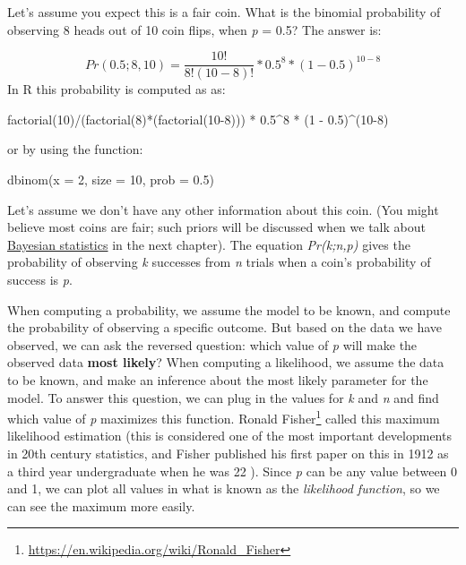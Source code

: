 \documentclass[
  oneside]{krantz}
\makeatletter
\newenvironment{Shaded}{\begin{snugshade}}{\end{snugshade}}
\newcommand{\AttributeTok}[1]{\textcolor[rgb]{0.61,0.61,0.61}{#1}}
\newcommand{\DecValTok}[1]{\textcolor[rgb]{0.06,0.06,0.06}{#1}}
\newcommand{\FloatTok}[1]{\textcolor[rgb]{0.06,0.06,0.06}{#1}}
\newcommand{\FunctionTok}[1]{\textcolor[rgb]{0,0,0}{#1}}
\newcommand{\NormalTok}[1]{#1}
\newcommand{\SpecialCharTok}[1]{\textcolor[rgb]{0,0,0}{#1}}
\renewcommand{\href}[2]{#2\footnote{\url{#1}}}
\newenvironment{kframe}{%
\medskip{}
\setlength{\fboxsep}{.8em}
 \def\at@end@of@kframe{}%
 \ifinner\ifhmode%
  \def\at@end@of@kframe{\end{minipage}}%
  \begin{minipage}{\columnwidth}%
 \fi\fi%
 \def\FrameCommand##1{\hskip\@totalleftmargin \hskip-\fboxsep
 \colorbox{shadecolor}{##1}\hskip-\fboxsep
     \hskip-\linewidth \hskip-\@totalleftmargin \hskip\columnwidth}%
 \MakeFramed {\advance\hsize-\width
   \@totalleftmargin\z@ \linewidth\hsize
   \@setminipage}}%
 {\par\unskip\endMakeFramed%
 \at@end@of@kframe}
\renewenvironment{Shaded}{\begin{kframe}}{\end{kframe}}
\makeatother
\begin{document}
Let's assume you expect this is a fair coin. What is the binomial probability of observing 8 heads out of 10 coin flips, when \emph{p} = 0.5? The answer is:

\[
Pr\left(0.5;8,10 \right) = \frac{10!}{8!\left( 10 - 8 \right)!}*0.5^{8}*{(1 - 0.5)}^{10 - 8}
\]
In R this probability is computed as as:

\begin{Shaded}
\begin{Highlighting}[]
\FunctionTok{factorial}\NormalTok{(}\DecValTok{10}\NormalTok{)}\SpecialCharTok{/}\NormalTok{(}\FunctionTok{factorial}\NormalTok{(}\DecValTok{8}\NormalTok{)}\SpecialCharTok{*}\NormalTok{(}\FunctionTok{factorial}\NormalTok{(}\DecValTok{10{-}8}\NormalTok{))) }\SpecialCharTok{*} \FloatTok{0.5}\SpecialCharTok{\^{}}\DecValTok{8} \SpecialCharTok{*}\NormalTok{ (}\DecValTok{1} \SpecialCharTok{{-}} \FloatTok{0.5}\NormalTok{)}\SpecialCharTok{\^{}}\NormalTok{(}\DecValTok{10{-}8}\NormalTok{)}
\end{Highlighting}
\end{Shaded}

or by using the function:

\begin{Shaded}
\begin{Highlighting}[]
\FunctionTok{dbinom}\NormalTok{(}\AttributeTok{x =} \DecValTok{2}\NormalTok{, }\AttributeTok{size =} \DecValTok{10}\NormalTok{, }\AttributeTok{prob =} \FloatTok{0.5}\NormalTok{)}
\end{Highlighting}
\end{Shaded}

Let's assume we don't have any other information about this coin. (You might believe most coins are fair; such priors will be discussed when we talk about \protect\hyperlink{bayes}{Bayesian statistics} in the next chapter). The equation \emph{Pr(k;n,p)} gives the probability of observing \emph{k} successes from \emph{n} trials when a coin's probability of success is \emph{p}.

When computing a probability, we assume the model to be known, and compute the probability of observing a specific outcome. But based on the data we have observed, we can ask the reversed question: which value of \emph{p} will make the observed data \textbf{most likely}? When computing a likelihood, we assume the data to be known, and make an inference about the most likely parameter for the model. To answer this question, we can plug in the values for \emph{k} and \emph{n} and find which value of \emph{p} maximizes this function. \href{https://en.wikipedia.org/wiki/Ronald_Fisher}{Ronald Fisher} called this maximum likelihood estimation (this is considered one of the most important developments in 20th century statistics, and Fisher published his first paper on this in 1912 as a third year undergraduate when he was 22 \citep{aldrich_r_1997}). Since \emph{p} can be any value between 0 and 1, we can plot all values in what is known as the \emph{likelihood function}, so we can see the maximum more easily.
\end{document}
